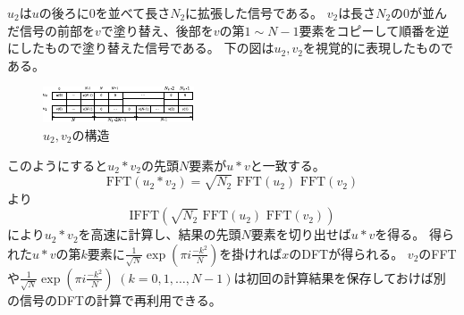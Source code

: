         $u_2$は$u$の後ろに$0$を並べて長さ$N_2$に拡張した信号である。
        $v_2$は長さ$N_2$の$0$が並んだ信号の前部を$v$で塗り替え、後部を$v$の第$1\sim N-1$要素をコピーして順番を逆にしたもので塗り替えた信号である。
        下の図は$u_2,v_2$を視覚的に表現したものである。
        \begin{figure}[H]
            \centering
            \includegraphics[keepaspectratio, scale=4]
            {parts/FourierSeries_and_FourierTransform/figs/FFT/arbitraryLengthFFT_to_powerOf2_FFT/u2,v2.pdf}
            \caption{$u_2,v_2$の構造}
        \end{figure}
        このようにすると$u_2*v_2$の先頭$N$要素が$u*v$と一致する。
        \[ \text{FFT}(u_2*v_2) = \sqrt{N_2}\text{ FFT}(u_2) \text{ FFT}(v_2) \]
        より
        \[ \text{IFFT}(\sqrt{N_2}\text{ FFT}(u_2) \text{ FFT}(v_2)) \]
        により$u_2*v_2$を高速に計算し、結果の先頭$N$要素を切り出せば$u*v$を得る。
        得られた$u*v$の第$k$要素に$\frac{1}{\sqrt{N}} \exp \left(\pi i\frac{-k^2}{N}\right)$を掛ければ$x$のDFTが得られる。
        $v_2$のFFTや$\frac{1}{\sqrt{N}} \exp \left(\pi i\frac{-k^2}{N}\right) \;(k=0,1,\dots,N-1)$は初回の計算結果を保存しておけば別の信号のDFTの計算で再利用できる。
